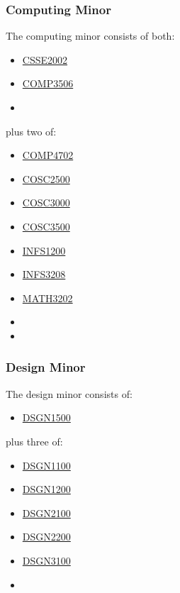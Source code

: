 \subsubsection{Computing Minor}
The computing minor consists of both:
\begin{multicols}{3}
    \begin{itemize}
        \item \hyperlink{CSSE2002}{CSSE2002}
        \item \hyperlink{COMP3506}{COMP3506}
        \item[]
    \end{itemize}
\end{multicols}
plus two of:
\begin{multicols}{3}
    \begin{itemize}
        \item \hyperlink{COMP4702}{COMP4702}
        \item \hyperlink{COSC2500}{COSC2500}
        \item \hyperlink{COSC3000}{COSC3000}
        \item \hyperlink{COSC3500}{COSC3500}
        \item \hyperlink{INFS1200}{INFS1200}
        \item \hyperlink{INFS3208}{INFS3208}
        \item \hyperlink{MATH3202}{MATH3202}
        \item[]
        \item[]
    \end{itemize}
\end{multicols}

\subsubsection{Design Minor}
The design minor consists of:
\begin{itemize}
    \item \hyperlink{DSGN1500}{DSGN1500}
\end{itemize}
plus three of:
\begin{multicols}{3}
    \begin{itemize}
        \item \hyperlink{DSGN1100}{DSGN1100}
        \item \hyperlink{DSGN1200}{DSGN1200}
        \item \hyperlink{DSGN2100}{DSGN2100}
        \item \hyperlink{DSGN2200}{DSGN2200}
        \item \hyperlink{DSGN3100}{DSGN3100}
        \item[]
    \end{itemize}
\end{multicols}

